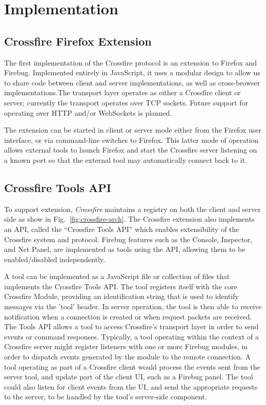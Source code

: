 \section{Implementation}

\subsection{Crossfire Firefox Extension}
The first implementation of the Crossfire protocol is an extension to Firefox
and Firebug. Implemented entirely in JavaScript, it uses a modular design to
allow us to share code between client and server implementations, as well as
cross-browser implementations.The transport layer operates as either a Crossfire
client or server; currently the transport operates over TCP sockets.
Future support for operating over HTTP and/or WebSockets is planned.

The extension can be started in client or server mode either from the Firefox
user interface, or via command-line switches to Firefox. This latter mode of
operation allows external tools to launch Firefox and start the Crossfire server
listening on a known port so that the external tool may automatically connect
back to it.


\subsection{Crossfire Tools API}
To support extension, \textit{Crossfire} maintains a registry on both the client
and server side as show in Fig.~\ref{fig:crossfire-arch}.
The Crossfire extension also implements an API, called the ``Crossfire Tools
API'' which enables extensibility of the Crossfire system and protocol. Firebug
features such as the Console, Inspector, and Net Panel, are implemented as tools
using the API, allowing them to be enabled/disabled independently.

A tool can be implemented as a JavaScript file or collection of files that
implements the Crossfire Tools API. The tool registers itself with the core
Crossfire Module, providing an identification string that is used to identify
messages via the 'tool' header. In server operation, the tool is then able to
receive notification when a connection is created or when request packets are
received. The Tools API allows a tool to access Crossfire's transport layer in
order to send events or command responses.  Typically, a tool operating within
the context of a Crossfire server might register listeners with one or more
Firebug modules, in order to dispatch events generated by the module to the
remote connection. A tool operating as part of a Crossfire client would process
the events sent from the server tool, and update part of the client UI, such as
a Firebug panel. The tool could also listen for client events from the UI, and
send the appropriate requests to the server, to be handled by the tool's
server-side component.

